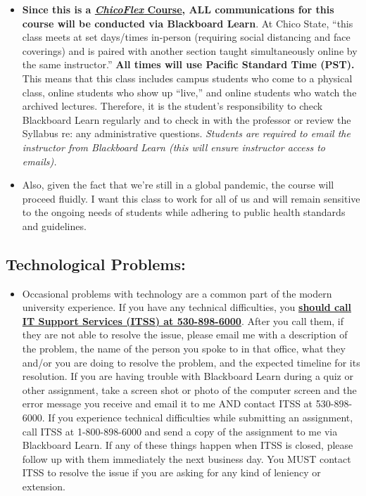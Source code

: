 \documentclass[11pt,]{article}
\providecommand{\tightlist}{%
  \setlength{\itemsep}{0pt}\setlength{\parskip}{0pt}}
\begin{document}
\begin{itemize}
\item
  \textbf{Since this is a
  \href{https://www.csuchico.edu/tlp/chicoflex/faq.shtml\#whatiscoflex}{\emph{ChicoFlex}
  Course}, ALL communications for this course will be conducted via
  Blackboard Learn}. At Chico State, ``this class meets at set
  days/times in-person (requiring social distancing and face coverings)
  and is paired with another section taught simultaneously online by the
  same instructor.'' \textbf{All times will use Pacific Standard Time
  (PST).} This means that this class includes campus students who come
  to a physical class, online students who show up ``live,'' and online
  students who watch the archived lectures. Therefore, it is the
  student's responsibility to check Blackboard Learn regularly and to
  check in with the professor or review the Syllabus re: any
  administrative questions. \emph{Students are required to email the
  instructor from Blackboard Learn (this will ensure instructor access
  to emails).}
\item
  Also, given the fact that we're still in a global pandemic, the course
  will proceed fluidly. I want this class to work for all of us and will
  remain sensitive to the ongoing needs of students while adhering to
  public health standards and guidelines.
\end{itemize}

\hypertarget{technological-problems}{%
\subsection{Technological Problems:}\label{technological-problems}}

\begin{itemize}
\tightlist
\item
  Occasional problems with technology are a common part of the modern
  university experience. If you have any technical difficulties, you
  \href{https://www.csuchico.edu/itss/}{\textbf{should call IT Support
  Services (ITSS) at 530-898-6000}}. After you call them, if they are
  not able to resolve the issue, please email me with a description of
  the problem, the name of the person you spoke to in that office, what
  they and/or you are doing to resolve the problem, and the expected
  timeline for its resolution. If you are having trouble with Blackboard
  Learn during a quiz or other assignment, take a screen shot or photo
  of the computer screen and the error message you receive and email it
  to me AND contact ITSS at 530-898-6000. If you experience technical
  difficulties while submitting an assignment, call ITSS at
  1-800-898-6000 and send a copy of the assignment to me via Blackboard
  Learn. If any of these things happen when ITSS is closed, please
  follow up with them immediately the next business day. You MUST
  contact ITSS to resolve the issue if you are asking for any kind of
  leniency or extension.
\end{itemize}
\end{document}
